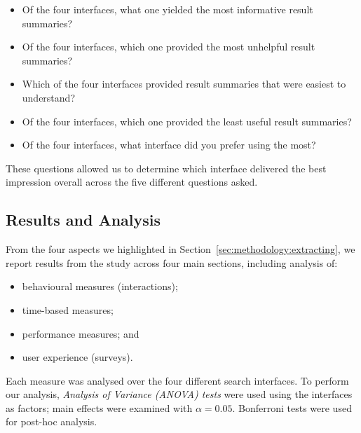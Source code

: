 \begin{itemize}
    \item{ Of the four interfaces, what one yielded the most informative result summaries?}
    \item{ Of the four interfaces, which one provided the most unhelpful result summaries?}
    \item{ Which of the four interfaces provided result summaries that were easiest to understand?}
    \item{ Of the four interfaces, which one provided the least useful result summaries?}
    \item{ Of the four interfaces, what interface did you prefer using the most?}
\end{itemize}

These questions allowed us to determine which interface delivered the best impression overall across the five different questions asked.

\subsection{Results and Analysis}\label{chap:snippets:user:results}
From the four aspects we highlighted in Section~\ref{sec:methodology:extracting}, we report results from the study across four main sections, including analysis of:

\begin{itemize}
    \item{behavioural measures (interactions);}
    \item{time-based measures;}
    \item{performance measures; and}
    \item{user experience (surveys).}
\end{itemize}

Each measure was analysed over the four different search interfaces. To perform our analysis, \emph{Analysis of Variance (ANOVA) tests} were used using the interfaces as factors; main effects were examined with $\alpha = 0.05$. Bonferroni tests were used for post-hoc analysis.

